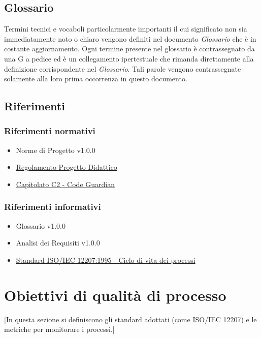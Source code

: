 \documentclass[12pt, a4paper]{article}
\begin{document}
\subsection{Glossario}
Termini tecnici e vocaboli particolarmente importanti il cui
significato non sia immediatamente noto o chiaro vengono definiti nel
documento \emph{Glossario} che è in costante aggiornamento. Ogni termine
presente nel glossario è contrassegnato da una G a pedice ed è un
collegamento ipertestuale che rimanda direttamente alla definizione
corrispondente nel \emph{Glossario}. Tali parole vengono contrassegnate
solamente alla loro prima occorrenza in questo documento.


\subsection{Riferimenti}
\subsubsection{Riferimenti normativi}
\begin{itemize}
\item
  Norme di Progetto v1.0.0
\item  
  \href{https://www.math.unipd.it/~tullio/IS-1/2025/Dispense/PD1.pdf}{Regolamento Progetto Didattico}
\item
  \href{https://www.math.unipd.it/~tullio/IS-1/2025/Progetto/C2.pdf}{Capitolato C2 - Code Guardian}
\end{itemize}

\subsubsection{Riferimenti informativi}
\begin{itemize}
\item
  Glossario v1.0.0
\item
  Analisi dei Requisiti v1.0.0
\item  
  \href{https://www.math.unipd.it/~tullio/IS-1/2009/Approfondimenti/ISO_12207-1995.pdf}{Standard ISO/IEC 12207:1995 - Ciclo di vita dei processi}
\end{itemize}



\section{Obiettivi di qualità di processo}
[In questa sezione si definiscono gli standard adottati (come ISO/IEC 12207) e le metriche per monitorare i processi.]
\end{document}
